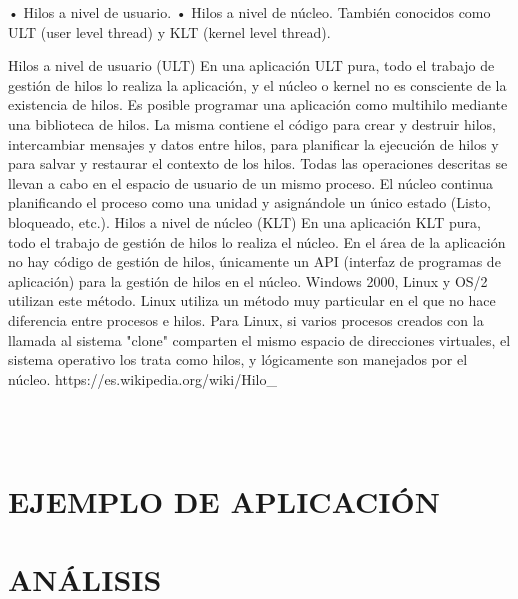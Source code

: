 \documentclass[conference]{IEEEtran}
\begin{document}
•	Hilos a nivel de usuario.
•	Hilos a nivel de núcleo.
También conocidos como ULT (user level thread) y KLT (kernel level thread).

Hilos a nivel de usuario (ULT)
En una aplicación ULT pura, todo el trabajo de gestión de hilos lo realiza la aplicación, y el núcleo o kernel no es consciente de la existencia de hilos. Es posible programar una aplicación como multihilo mediante una biblioteca de hilos. La misma contiene el código para crear y destruir hilos, intercambiar mensajes y datos entre hilos, para planificar la ejecución de hilos y para salvar y restaurar el contexto de los hilos.
Todas las operaciones descritas se llevan a cabo en el espacio de usuario de un mismo proceso. El núcleo continua planificando el proceso como una unidad y asignándole un único estado (Listo, bloqueado, etc.).
Hilos a nivel de núcleo (KLT)
En una aplicación KLT pura, todo el trabajo de gestión de hilos lo realiza el núcleo. En el área de la aplicación no hay código de gestión de hilos, únicamente un API (interfaz de programas de aplicación) para la gestión de hilos en el núcleo. Windows 2000, Linux y OS/2 utilizan este método. Linux utiliza un método muy particular en el que no hace diferencia entre procesos e hilos. Para Linux, si varios procesos creados con la llamada al sistema "clone" comparten el mismo espacio de direcciones virtuales, el sistema operativo los trata como hilos, y lógicamente son manejados por el núcleo.
https://es.wikipedia.org/wiki/Hilo_%




\\\\

\section{EJEMPLO DE APLICACIÓN}






\section{ANÁLISIS}
\begin{itemize}
\\







\end{itemize}
\\\\

\begin{thebibliography}{00}











\end{thebibliography}
\end{document}
